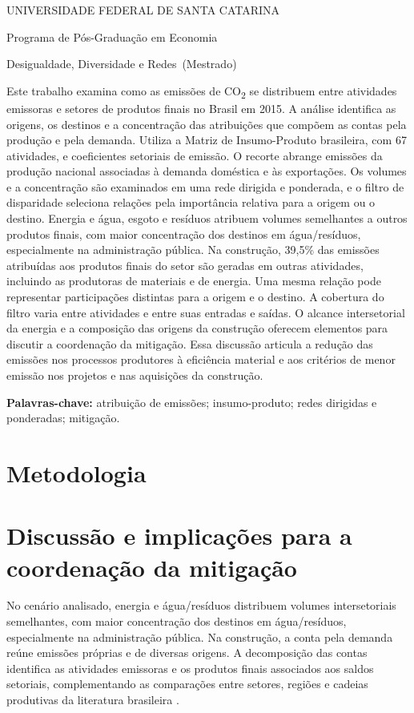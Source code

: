 \documentclass[11pt]{article}
\renewenvironment{abstract}{\par\medskip\noindent\textbf{\abstractname}\par\smallskip\small\setstretch{1}\noindent}{\par\medskip}
\newcommand{\instituicao}{UNIVERSIDADE FEDERAL DE SANTA CATARINA}
\newcommand{\departamento}{Programa de Pós-Graduação em Economia}
\newcommand{\curso}{Mestrado}
\newcommand{\disciplina}{Desigualdade, Diversidade e Redes}
\newcommand{\titulo}{Rede de emissões de CO\textsubscript{2} no Brasil}
\newcommand{\autor}{Gabriel Pincelli Cintra}
\newcommand{\local}{Florianópolis}
\newcommand{\dataentrega}{18 de outubro de 2026}
\newcommand{\imprimirtitulodois}{
\begin{center}
  {\small\MakeUppercase{\instituicao}\par}
  {\small \departamento\par}
  {\small \disciplina\ (\curso)\par}
  \vspace{1em}{\LARGE\bfseries \titulo\par}
  \vspace{0.7em}{\normalsize \autor\par}
  \vspace{0.3em}{\small \local, \dataentrega\par}
\end{center}
\vspace{0.4em}}
\begin{document}
\imprimirtitulodois
\thispagestyle{empty}
\begin{abstract}
Este trabalho examina como as emissões de CO\textsubscript{2} se distribuem entre atividades emissoras e setores de produtos finais no Brasil em 2015. A análise identifica as origens, os destinos e a concentração das atribuições que compõem as contas pela produção e pela demanda. Utiliza a Matriz de Insumo-Produto brasileira, com 67 atividades, e coeficientes setoriais de emissão. O recorte abrange emissões da produção nacional associadas à demanda doméstica e às exportações. Os volumes e a concentração são examinados em uma rede dirigida e ponderada, e o filtro de disparidade seleciona relações pela importância relativa para a origem ou o destino. Energia e água, esgoto e resíduos atribuem volumes semelhantes a outros produtos finais, com maior concentração dos destinos em água/resíduos, especialmente na administração pública. Na construção, 39,5\% das emissões atribuídas aos produtos finais do setor são geradas em outras atividades, incluindo as produtoras de materiais e de energia. Uma mesma relação pode representar participações distintas para a origem e o destino. A cobertura do filtro varia entre atividades e entre suas entradas e saídas. O alcance intersetorial da energia e a composição das origens da construção oferecem elementos para discutir a coordenação da mitigação. Essa discussão articula a redução das emissões nos processos produtores à eficiência material e aos critérios de menor emissão nos projetos e nas aquisições da construção.
\end{abstract}
\noindent\textbf{Palavras-chave:} atribuição de emissões; insumo-produto; redes dirigidas e ponderadas; mitigação.

\clearpage

\clearpage
\section{Metodologia}



\clearpage

\clearpage
\section{Discussão e implicações para a coordenação da mitigação}

No cenário analisado, energia e água/resíduos distribuem volumes intersetoriais semelhantes, com maior concentração dos destinos em água/resíduos, especialmente na administração pública. Na construção, a conta pela demanda reúne emissões próprias e de diversas origens. A decomposição das contas identifica as atividades emissoras e os produtos finais associados aos saldos setoriais, complementando as comparações entre setores, regiões e cadeias produtivas da literatura brasileira \parencite{imori2015,sanguinetAzzoni2024,montoyaEtAl2026}.
\end{document}
